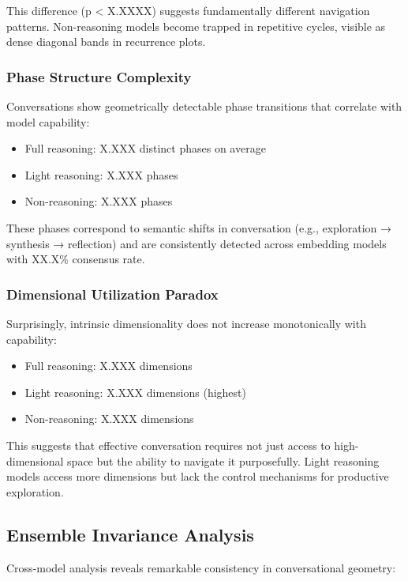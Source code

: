 \documentclass[11pt,letterpaper]{article}
\newcommand{\fullIntrinsicDim}{X.XXX}
\newcommand{\lightIntrinsicDim}{X.XXX}
\newcommand{\nonIntrinsicDim}{X.XXX}
\newcommand{\fullPhaseCount}{X.XXX}
\newcommand{\lightPhaseCount}{X.XXX}
\newcommand{\nonPhaseCount}{X.XXX}
\newcommand{\pValueEmbeddingLoops}{X.XXXX}
\newcommand{\ensemblePhaseCons}{XX.X\%}
\begin{document}
This difference (p < \pValueEmbeddingLoops{}) suggests fundamentally different navigation patterns. Non-reasoning models become trapped in repetitive cycles, visible as dense diagonal bands in recurrence plots.

\subsubsection{Phase Structure Complexity}

Conversations show geometrically detectable phase transitions that correlate with model capability:
\begin{itemize}
\item Full reasoning: \fullPhaseCount{} distinct phases on average
\item Light reasoning: \lightPhaseCount{} phases
\item Non-reasoning: \nonPhaseCount{} phases
\end{itemize}

These phases correspond to semantic shifts in conversation (e.g., exploration → synthesis → reflection) and are consistently detected across embedding models with \ensemblePhaseCons{} consensus rate.

\subsubsection{Dimensional Utilization Paradox}

Surprisingly, intrinsic dimensionality does not increase monotonically with capability:
\begin{itemize}
\item Full reasoning: \fullIntrinsicDim{} dimensions
\item Light reasoning: \lightIntrinsicDim{} dimensions (highest)
\item Non-reasoning: \nonIntrinsicDim{} dimensions
\end{itemize}

This suggests that effective conversation requires not just access to high-dimensional space but the ability to navigate it purposefully. Light reasoning models access more dimensions but lack the control mechanisms for productive exploration.

\subsection{Ensemble Invariance Analysis}

Cross-model analysis reveals remarkable consistency in conversational geometry:
\end{document}
